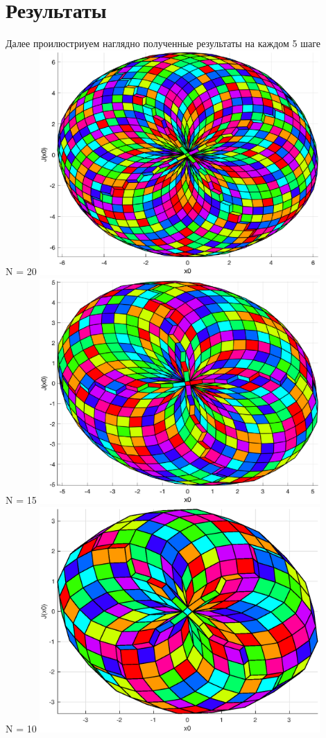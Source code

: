 \section{Результаты}\label{2sec:results}
Далее проилюстриуем наглядно полученные результаты на каждом 5 шаге\\ 

N = 20
\includegraphics[width=0.8\textwidth]{figure1.eps}\\
N = 15
\includegraphics[width=0.8\textwidth]{figure5.eps}\\
N = 10
\includegraphics[width=0.8\textwidth]{figure10.eps}\\

